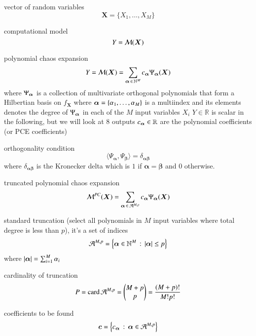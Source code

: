 
vector of random variables
\begin{equation}
    \bm{X} = \{X_1, \dots , X_M\}
\end{equation}

computational model
\begin{equation}
    Y = \mathcal{M} ( \bm X )
\end{equation}

polynomial chaos expansion
\begin{equation}
    Y = \mathcal{M} ( \bm X ) = \sum_{{\bm{\alpha}} \,\in\, \mathbb{N}^M} c_{{\bm{\alpha}}} \Psi_{{\bm{\alpha}}} (\bm X)
\end{equation}
where $\Psi_{\bm{\alpha}}$ is a collection of multivariate orthogonal polynomials that form a Hilbertian basis on $f_{\bm X}$
where ${\bm{\alpha}} = \{\alpha_1,\dots,\alpha_M\}$ is a multiindex and its elements
denotes the degree of $\Psi_{\bm{\alpha}}$ in each of the $M$ input variables $X_i$
$Y\in\mathbb{R}$ is scalar in the following, but we will look at 8 outputs
$c_{\bm{\alpha}} \in \mathbb{R}$ are the polynomial coefficients (or PCE coefficients)

orthogonality condition
\begin{equation}
    \langle \Psi_{\bm\alpha}, \Psi_{\bm\beta} \rangle = \delta_{\bm{\alpha\beta}}
\end{equation}
where $\delta_{\bm{\alpha\beta}}$ is the Kronecker delta which is $1$ if $\bm\alpha=\bm\beta$ and $0$ otherwise.

truncated polynomial chaos expansion
\begin{equation}
    \mathcal{M}^{PC}(\bm X) = \sum_{{\bm{\alpha}} \,\in\, \mathcal{A}^{M,p}} c_{\bm{\alpha}} \Psi_{\bm{\alpha}}(\bm X)
\end{equation}

standard truncation (select all polynomials in $M$ input variables where total degree is less than $p$), it's a set of indices
\begin{equation}
    \mathcal{A}^{M,p} = \left\{{\bm{\alpha}} \in \mathbb{N}^M \,:\, \left|{\bm{\alpha}}\right| \leq p\right\}
\end{equation}
where $\left|{\bm{\alpha}}\right| = \sum_{i=1}^M \alpha_i$

cardinality of truncation
\begin{equation}
    P = \text{card}\, \mathcal{A}^{M,p} = \left(\begin{matrix}
        M+p \\
        p
    \end{matrix}\right) = \frac{(M+p)!}{M!p!}
\end{equation}

coefficients to be found
\begin{equation}
    \bm c = \left\{c_{\bm{\alpha}} \,:\, {\bm{\alpha}} \in \mathcal{A}^{M,p}\right\}
\end{equation}

